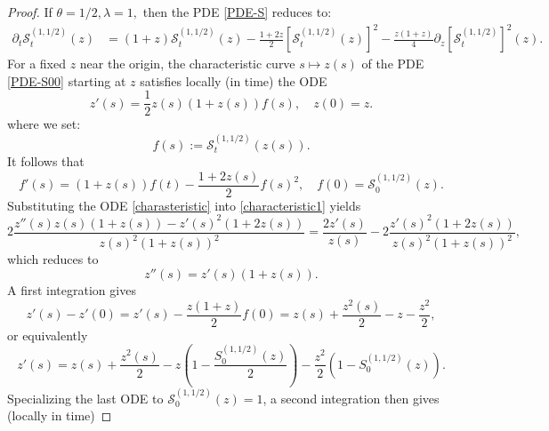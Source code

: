 \documentclass[12pt,reqno]{amsart}
\begin{document}
\begin{proof}
	If $\theta = 1/2, \lambda =1,$ then the PDE \eqref{PDE-S} reduces to:
	\begin{align}\label{PDE-S00}
		\partial_t \mathcal{S}_t^{(1,1/2)}(z) & =  (1+z)\mathcal{S}_t^{(1,1/2)}(z) -\frac{1+2z}{2}\left[\mathcal{S}_t^{(1,1/2)}(z)\right]^2
		-\frac{z(1+z)}{4}\partial_z\left[\mathcal{S}_t^{(1,1/2)}\right]^2(z).
	\end{align}
	For a fixed $z$ near the origin, the characteristic curve $s \mapsto z(s)$ of the PDE \eqref{PDE-S00} starting at $z$ satisfies locally (in time) the ODE
	\begin{equation}\label{charasteristic}
		z'(s)=\frac{1}{2}z(s)(1+z(s))f(s), \quad z(0)=z.
	\end{equation}
	where we set:  
    $$
    f(s) :=\mathcal{S}_t^{(1,1/2)}(z(s)).
    $$
	It follows that 
    \begin{equation}\label{characteristic1}
		f'(s)=(1+z(s))f(t)-\frac{1+2z(s)}{2}f(s)^2, \quad f(0)=\mathcal{S}_0^{(1,1/2)}(z).
	\end{equation}
	Substituting the ODE \eqref{charasteristic} into \eqref{characteristic1} yields
	\begin{equation*}
		2\frac{z''(s)z(s)(1+z(s))-z'(s)^2(1+2z(s))}{z(s)^2(1+z(s))^2}=\frac{2z'(s)}{z(s)}-2\frac{z'(s)^2(1+2z(s))}{z(s)^2(1+z(s))^2},
	\end{equation*}
	which reduces to
	\begin{equation*}
		z''(s)= z'(s)(1+z(s)).
	\end{equation*}
	A first integration gives
	\begin{equation*}
		z'(s) - z'(0) = z'(s) - \frac{z(1+z)}{2}f(0) = z(s) +\frac{z^2(s)}{2} - z - \frac{z^2}{2},
	\end{equation*}
	or equivalently
	\begin{equation*}
		z'(s)  = z(s) +\frac{z^2(s)}{2} - z\left(1-\frac{S_0^{(1,1/2)}(z)}{2}\right) - \frac{z^2}{2}(1-S_0^{(1,1/2)}(z)).
	\end{equation*}
	Specializing the last ODE to $\mathcal{S}_0^{(1,1/2)}(z) = 1$, a second integration then gives (locally in time)

\end{proof}
\end{document}

